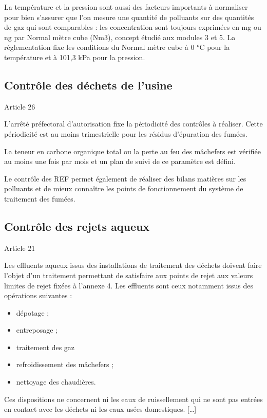 La température et la pression sont aussi des facteurs importants à normaliser pour bien s’assurer que l’on mesure une quantité de polluants sur des quantités de gaz qui sont comparables : les concentration sont toujours exprimées en mg ou ng par Normal mètre cube (Nm3), concept étudié aux modules 3 et 5. La réglementation fixe les conditions du Normal mètre cube à 0 °C pour la température et à 101,3 kPa pour la pression. 


\subsection{Contrôle des déchets de l'usine}

\vspace{0.3cm}

Article 26
\vspace{0.3cm}

\begin{tcolorbox}[colback=blue!5!white,colframe=blue!75!black]
L’arrêté préfectoral d’autorisation fixe la périodicité des contrôles à réaliser. Cette périodicité est au moins trimestrielle pour les résidus d’épuration des fumées.
 \vspace{0.3cm}

La teneur en carbone organique total ou la perte au feu des mâchefers est vérifiée au moins une fois par mois et un plan de suivi de ce paramètre est défini.
\end{tcolorbox}

\vspace{0.3cm}

Le contrôle des REF permet également de réaliser des bilans matières sur les polluants et de mieux connaître les points de fonctionnement du système de traitement des fumées.

\subsection{Contrôle des rejets aqueux}

\vspace{0.3cm}

Article 21
\vspace{0.3cm}
\begin{tcolorbox}[colback=blue!5!white,colframe=blue!75!black]
Les effluents aqueux issus des installations de traitement des déchets doivent faire l’objet d’un traitement permettant de satisfaire aux points de rejet aux valeurs limites de rejet fixées à l’annexe 4.  Les effluents sont ceux notamment issus des opérations suivantes :
\begin{itemize}
\item dépotage ;
\item entreposage ;
\item  traitement des gaz
\item refroidissement des mâchefers ;
\item  nettoyage des chaudières.
\end{itemize}

Ces dispositions ne concernent ni les eaux de ruissellement qui ne sont pas entrées en contact avec les déchets ni les eaux usées domestiques. [\dots]
\end{tcolorbox}


